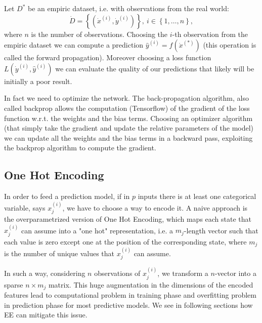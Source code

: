 \documentclass{article}
\begin{document}
Let $D^*$ be an empiric dataset, i.e. with observations from the real world:
\begin{equation}
    \dot{D} = \left\{ \left( \dot{x}^{(i)}, \dot{y}^{(i)} \right)\right\},\ i \in \left\{ 1, \dots, n \right\},
\end{equation}
where $n$ is the number of observations. Choosing the $i$-th observation from the empiric dataset we can compute a prediction $\hat{y}^{(i)} = \hat{f}\left(\dot{x}^{(*)}\right)$ (this operation is called the forward propagation). Moreover choosing a loss function $L(\dot{y}^{(i)}, \hat{y}^{(i)})$ we can evaluate the quality of our predictions that likely will be initially a poor result.

In fact we need to optimize the network. The back-propagation algorithm, also called backprop allows the computation (Tensorflow\cite{tf}) of the gradient of the loss function w.r.t. the weights and the bias terms.
Choosing an optimizer algorithm (that simply take the gradient and update the relative parameters of the model) we can update all the weights and the bias terms in a backward pass, exploiting the backprop algorithm to compute the gradient.

\subsection{One Hot Encoding}
In order to feed a prediction model, if in $p$ inputs there is at least one categorical variable, says $x^{(i)}_j$, we have to choose a way to encode it.
A naive approach is the overparametrized version of One Hot Encoding, which maps each state that $x^{(i)}_j$ can assume into a "one hot" representation, i.e. a $m_j$-length vector such that each value is zero except one at the position of the corresponding state, where $m_j$ is the number of unique values that $x^{(i)}_j$ can assume.

In such a way, considering $n$ observations of $x^{(i)}_j$, we transform a $n$-vector into a sparse $n \times m_j$ matrix. This huge augmentation in the dimensions of the encoded features lead to computational problem in training phase and overfitting problem in prediction phase for most predictive models. We see in following sections how EE can mitigate this issue.
\end{document}
